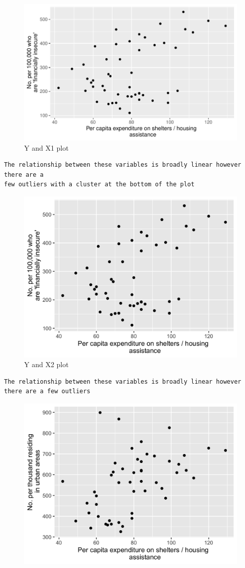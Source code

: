 \documentclass[12pt,letterpaper]{article}
\begin{document}
		\begin{figure}[h!]
			\centering
			\includegraphics[width=0.7\linewidth]{../yx1}
			\caption{Y and X1 plot\\}
			\label{fig:yx1}
		\end{figure}
	\begin{verbatim}
The relationship between these variables is broadly linear however there are a 
few outliers with a cluster at the bottom of the plot
	\end{verbatim}
		
		\begin{figure}[h!]
		\centering
		\includegraphics[width=0.7\linewidth]{../plot2}
		\caption{Y and X2 plot}
		\label{fig:Y and X2}
		\end{figure}
	\begin{verbatim}
The relationship between these variables is broadly linear however there are a few outliers 
\end{verbatim}

\begin{figure}[H]
	\centering
	\includegraphics[width=0.7\linewidth]{../plot3}
	\caption{}
	\label{fig:plot3}
\end{figure}
\end{document}
